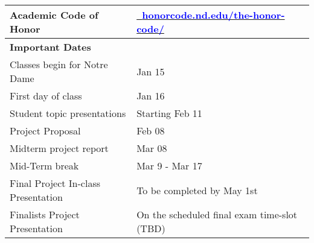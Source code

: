 \begin{center}
\begin{longtable}{ p{} p{} }
\textbf{Academic Code of Honor} & \href{http://honorcode.nd.edu/the-honor-code/}{\textcolor{blue}{~\url{honorcode.nd.edu/the-honor-code/}}}\\
\midrule
\textbf{Important Dates }& \\
Classes begin for Notre Dame & Jan 15 \\
First day of class  & Jan 16 \\
Student topic presentations & Starting Feb 11 \\
Project Proposal & Feb 08 \\
Midterm project report & Mar 08 \\
Mid-Term break & Mar 9 - Mar 17 \\
Final Project In-class Presentation & To be completed by May 1st\\
Finalists Project Presentation &  On the scheduled final exam time-slot (TBD)\\


\end{longtable}
\end{center}%